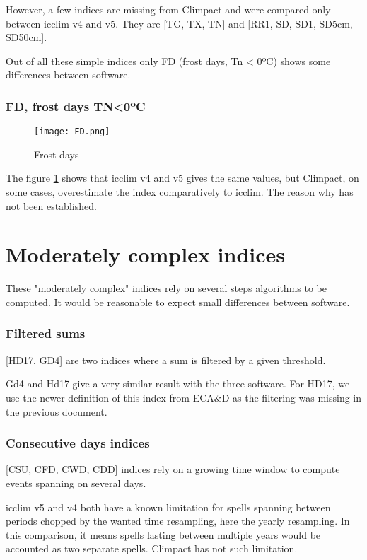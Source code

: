 \documentclass[a4paper,11pt]{article}
\begin{document}
    However, a few indices are missing from Climpact and were compared only between icclim v4 and v5. 
    They are [TG, TX, TN] and [RR1, SD, SD1, SD5cm, SD50cm].

    Out of all these simple indices only FD (frost days, Tn < 0ºC) shows some differences between software.

    \section{FD, frost days TN<0ºC}
        \begin{figure}[h]
            \centering
            \texttt{[image: FD.png]}
            \caption{Frost days}
            \label{figure/fd}
        \end{figure}
        The figure \ref{figure/fd} shows that icclim v4 and v5 gives the same values, but Climpact, on some cases, overestimate the index comparatively to icclim.
        The reason why has not been established.
        

\part{Moderately complex indices}
    These "moderately complex" indices rely on several steps algorithms to be computed.
    It would be reasonable to expect small differences between software.

    \section{Filtered sums}
        [HD17, GD4] are two indices where a sum is filtered by a given threshold.

        Gd4 and Hd17 give a very similar result with the three software.
        For HD17, we use the newer definition of this index from ECA\&D \cite{doc/ecad_new} as the filtering was missing in the previous document.

    \section{Consecutive days indices} \label{section/consecutive_days}
        [CSU, CFD, CWD, CDD] indices rely on a growing time window to compute events spanning on several days.

        icclim v5 and v4 both have a known limitation for spells spanning between periods chopped by the wanted time resampling, here the yearly resampling.
        In this comparison, it means spells lasting between multiple years would be accounted as two separate spells.
        Climpact has not such limitation.
\end{document}
